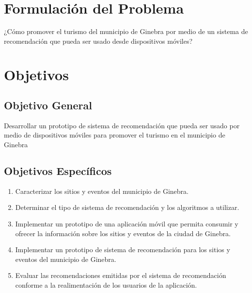 \documentclass[12pt,letterpaper,openany]{book}
\begin{document}
\section{Formulación del Problema}
¿Cómo promover el turismo del municipio de Ginebra por medio de un sistema de recomendación que pueda ser usado desde dispositivos móviles?

\section{Objetivos}
\subsection{Objetivo General}
Desarrollar un prototipo de sistema de recomendación que pueda ser usado por medio de dispositivos móviles para promover el turismo en el municipio de Ginebra
\subsection{Objetivos Específicos}
\begin{enumerate}
    \item Caracterizar los sitios y eventos del municipio de Ginebra.
    \item Determinar el tipo de sistema de recomendación y los algoritmos a utilizar.
    \item Implementar un prototipo de una aplicación móvil que permita consumir y ofrecer la información sobre los sitios y eventos de la ciudad de Ginebra.
    \item Implementar un prototipo de sistema de recomendación para los sitios y eventos del municipio de Ginebra.
    \item Evaluar las recomendaciones emitidas por el sistema de recomendación conforme a la realimentación de los usuarios de la aplicación.
\end{enumerate}
\end{document}

